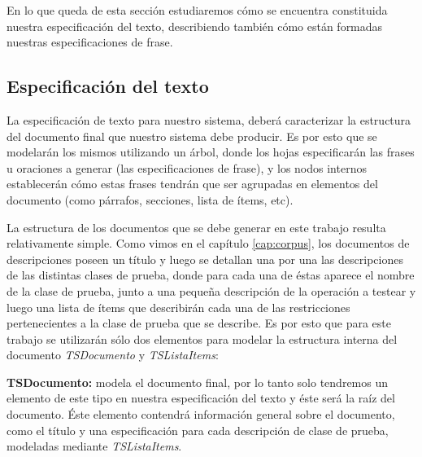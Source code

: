 En lo que queda de esta sección estudiaremos cómo se encuentra constituida nuestra especificación del texto, describiendo también cómo están formadas nuestras especificaciones de frase.

\subsection{Especificación del texto}



La especificación de texto para nuestro sistema, deberá caracterizar la estructura del documento final que nuestro sistema debe producir. Es por esto que se modelarán los mismos utilizando un árbol, donde los hojas especificarán las frases u oraciones a generar (las especificaciones de frase), y los nodos internos establecerán cómo estas frases tendrán que ser agrupadas en elementos del documento (como párrafos, secciones, lista de ítems, etc). 

La estructura de los documentos que se debe generar en este trabajo resulta relativamente simple. Como vimos en el capítulo \ref{cap:corpus}, los documentos de descripciones poseen un título y luego se detallan una por una las descripciones de las distintas clases de prueba, donde para cada una de éstas aparece el nombre de la clase de prueba, junto a una pequeña descripción de la operación a testear y luego una lista de ítems que describirán cada una de las restricciones pertenecientes a la clase de prueba que se describe. Es por esto que para este trabajo se utilizarán sólo dos elementos para modelar la estructura interna del documento \emph{TSDocumento} y \emph{TSListaItems}:

\medskip
\noindent
\textbf{TSDocumento:} modela el documento final, por lo tanto solo tendremos un elemento de este tipo en nuestra especificación del texto y éste será la raíz del documento. Éste elemento contendrá información general sobre el documento, como el título y una especificación para cada descripción de clase de prueba, modeladas mediante \emph{TSListaItems}.

